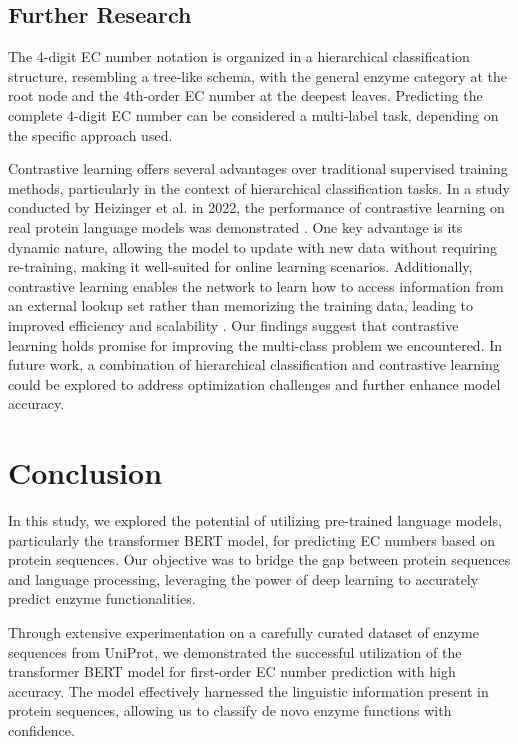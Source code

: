 \documentclass[conference]{IEEEtran}
\begin{document}
\subsection{Further Research}

The 4-digit EC number notation is organized in a hierarchical classification structure, resembling a tree-like schema, with the general enzyme category at the root node and the 4th-order EC number at the deepest leaves. Predicting the complete 4-digit EC number can be considered a multi-label task, depending on the specific approach used.

Contrastive learning offers several advantages over traditional supervised training methods, particularly in the context of hierarchical classification tasks. In a study conducted by Heizinger et al. in 2022, the performance of contrastive learning on real protein language models was demonstrated \cite{20}. One key advantage is its dynamic nature, allowing the model to update with new data without requiring re-training, making it well-suited for online learning scenarios. Additionally, contrastive learning enables the network to learn how to access information from an external lookup set rather than memorizing the training data, leading to improved efficiency and scalability \cite{20}. Our findings suggest that contrastive learning holds promise for improving the multi-class problem we encountered. In future work, a combination of hierarchical classification and contrastive learning could be explored to address optimization challenges and further enhance model accuracy.



\section{Conclusion}


In this study, we explored the potential of utilizing pre-trained language models, particularly the transformer BERT model, for predicting EC numbers based on protein sequences. Our objective was to bridge the gap between protein sequences and language processing, leveraging the power of deep learning to accurately predict enzyme functionalities.

Through extensive experimentation on a carefully curated dataset of enzyme sequences from UniProt, we demonstrated the successful utilization of the transformer BERT model for first-order EC number prediction with high accuracy. The model effectively harnessed the linguistic information present in protein sequences, allowing us to classify de novo enzyme functions with confidence.
\end{document}
